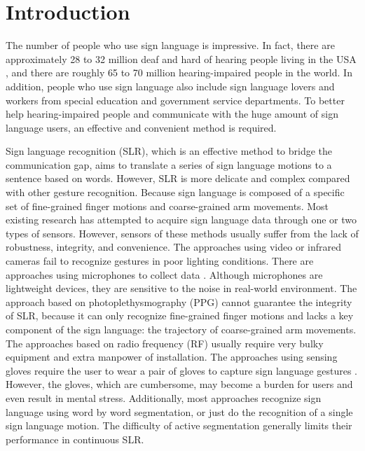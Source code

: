\documentclass[10pt, conference, letterpaper]{IEEEtran}
\begin{document}
\IEEEpeerreviewmaketitle

\section{Introduction}
The number of people who use sign language is impressive. In fact, there are approximately 28 to 32 million deaf and hard of hearing people living in the USA \cite{population.org}, and there are roughly 65 to 70 million hearing-impaired people in the world. In addition, people who use sign language also include sign language lovers and workers from special education and government service departments. To better help hearing-impaired people and communicate with the huge amount of sign language users, an effective and convenient method is required. 

Sign language recognition (SLR), which is an effective method to bridge the communication gap, aims to translate a series of sign language motions to a sentence based on words. However, SLR is more delicate and complex compared with other gesture recognition. Because sign language is composed of a specific set of fine-grained finger motions and coarse-grained arm movements. Most existing research has attempted to acquire sign language data through one or two types of sensors. However, sensors of these methods usually suffer from the lack of robustness, integrity, and convenience. The approaches using video or infrared cameras \cite{huang2018video,neto2018sign,joshi2017personalizing,cui2017recurrent,tsironi2016gesture,dong2015american} fail to recognize gestures in poor lighting conditions. There are approaches using microphones to collect data \cite{mao2016cat,nandakumar2016fingerio}. Although microphones are lightweight devices, they are sensitive to the noise in real-world environment. The approach based on photoplethysmography (PPG) \cite{zhao2018ppg} cannot guarantee the integrity of SLR, because it can only recognize fine-grained finger motions and lacks a key component of the sign language: the trajectory of coarse-grained arm movements. The approaches based on radio frequency (RF) \cite{zhang2017doppler,sun2015widraw,pu2013whole,asadzadeh2012gesture} usually require very bulky equipment and extra manpower of installation. The approaches using sensing gloves require the user to wear a pair of gloves to capture sign language gestures \cite{swee2007wireless,mantyjarvi2004enabling,mehdi2002sign}. However, the gloves, which are cumbersome, may become a burden for users and even result in mental stress. Additionally, most approaches recognize sign language using word by word segmentation, or just do the recognition of a single sign language motion. The difficulty of active segmentation generally limits their performance in continuous SLR.
\end{document}
